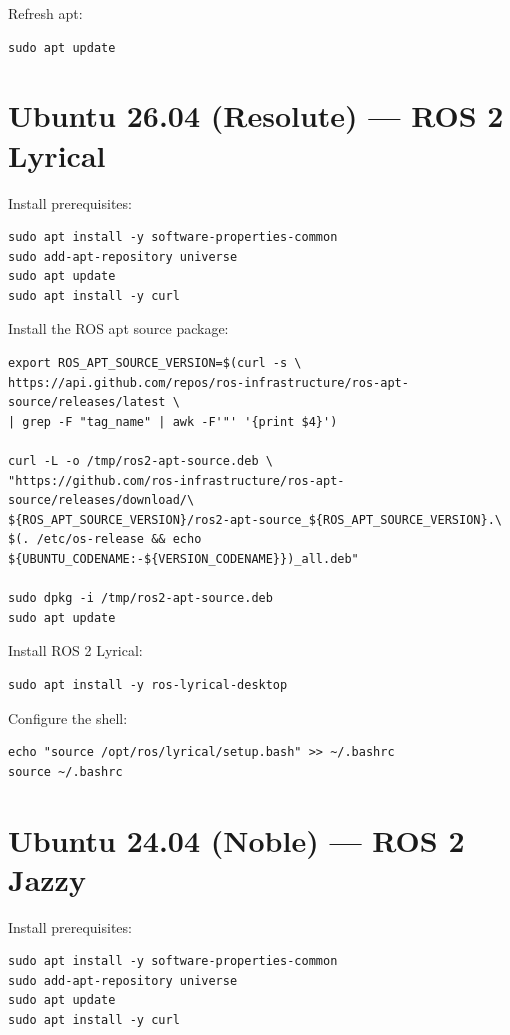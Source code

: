 \documentclass[11pt]{article}
\begin{document}
Refresh apt:

\begin{verbatim}
sudo apt update
\end{verbatim}

\section{Ubuntu 26.04 (Resolute) --- ROS 2 Lyrical}

Install prerequisites:

\begin{verbatim}
sudo apt install -y software-properties-common
sudo add-apt-repository universe
sudo apt update
sudo apt install -y curl
\end{verbatim}

Install the ROS apt source package:

\begin{verbatim}
export ROS_APT_SOURCE_VERSION=$(curl -s \
https://api.github.com/repos/ros-infrastructure/ros-apt-source/releases/latest \
| grep -F "tag_name" | awk -F'"' '{print $4}')

curl -L -o /tmp/ros2-apt-source.deb \
"https://github.com/ros-infrastructure/ros-apt-source/releases/download/\
${ROS_APT_SOURCE_VERSION}/ros2-apt-source_${ROS_APT_SOURCE_VERSION}.\
$(. /etc/os-release && echo ${UBUNTU_CODENAME:-${VERSION_CODENAME}})_all.deb"

sudo dpkg -i /tmp/ros2-apt-source.deb
sudo apt update
\end{verbatim}

Install ROS 2 Lyrical:

\begin{verbatim}
sudo apt install -y ros-lyrical-desktop
\end{verbatim}

Configure the shell:

\begin{verbatim}
echo "source /opt/ros/lyrical/setup.bash" >> ~/.bashrc
source ~/.bashrc
\end{verbatim}

\section{Ubuntu 24.04 (Noble) --- ROS 2 Jazzy}

Install prerequisites:

\begin{verbatim}
sudo apt install -y software-properties-common
sudo add-apt-repository universe
sudo apt update
sudo apt install -y curl
\end{verbatim}
\end{document}

